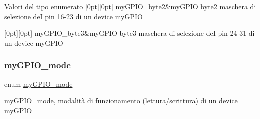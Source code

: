 \begin{DoxyEnumFields}{Valori del tipo enumerato}
[0pt][0pt]{}\mbox{\label{group__bare-metal_gga402a0d20afc0cb7c25554b8b023f4253af4892f7db28c64a7cf2a7236c88b742b}} 
my\+G\+P\+I\+O\+\_\+byte2&my\+G\+P\+IO byte2 maschera di selezione deI pin 16-\/23 di un device my\+G\+P\+IO \\
\hline

[0pt][0pt]{}\mbox{\label{group__bare-metal_gga402a0d20afc0cb7c25554b8b023f4253a1ceefb9d65397352e986c573984d0129}} 
my\+G\+P\+I\+O\+\_\+byte3&my\+G\+P\+IO byte3 maschera di selezione deI pin 24-\/31 di un device my\+G\+P\+IO \\
\hline

\end{DoxyEnumFields}
\mbox{\label{group__bare-metal_ga76b849f0e0c05e7f9161bdb33396f2b1}} 
\subsubsection{\texorpdfstring{my\+G\+P\+I\+O\+\_\+mode}{myGPIO\_mode}}
{\footnotesize\ttfamily enum \hyperlink{group__bare-metal_ga76b849f0e0c05e7f9161bdb33396f2b1}{my\+G\+P\+I\+O\+\_\+mode}}



my\+G\+P\+I\+O\+\_\+mode, modalità di funzionamento (lettura/scrittura) di un device my\+G\+P\+IO 

